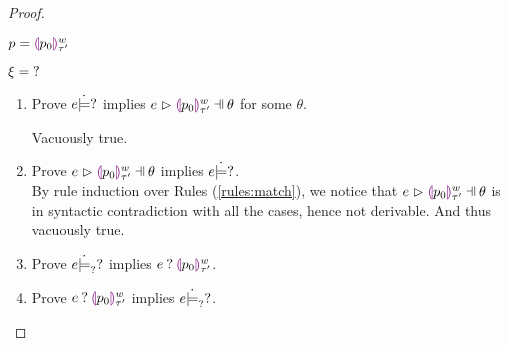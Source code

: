 \begin{proof}
\begin{byCases}
\item[\text{(\ref{rule:PTHole})}]
    \begin{pfsteps*}
    \item $p=\textcolor{violet}{\llparenthesis} p_0\textcolor{violet}{\rrparenthesis}^{w}_{\tau'}$ 
    \item $\xi=\mathtt{?}$ 
    \end{pfsteps*}
    \begin{enumerate}
    \item Prove $e \dot{\models} \mathtt{?}$ implies $\hpatmatch{e}{\hholep{p_0}{w}{\tau'}}{\theta}$ for some $\theta$.
        Vacuously true.
    \item Prove $\hpatmatch{e}{\hholep{p_0}{w}{\tau'}}{\theta}$ implies $e \dot{\models} \mathtt{?}$.\\
        By rule induction over Rules (\ref{rules:match}), we notice that $\hpatmatch{e}{\hholep{p_0}{w}{\tau'}}{\theta}$ is in syntactic contradiction with all the cases, hence not derivable. And thus vacuously true.
    \item Prove $e \dot{\models}_{?} \mathtt{?}$ implies $e \mathbin{?} \textcolor{violet}{\llparenthesis} p_0\textcolor{violet}{\rrparenthesis}^{w}_{\tau'}$.
    \item Prove $e \mathbin{?} \textcolor{violet}{\llparenthesis} p_0\textcolor{violet}{\rrparenthesis}^{w}_{\tau'}$ implies $e \dot{\models}_{?} \mathtt{?}$.
    \end{enumerate}
    

\end{byCases}
\end{proof}
